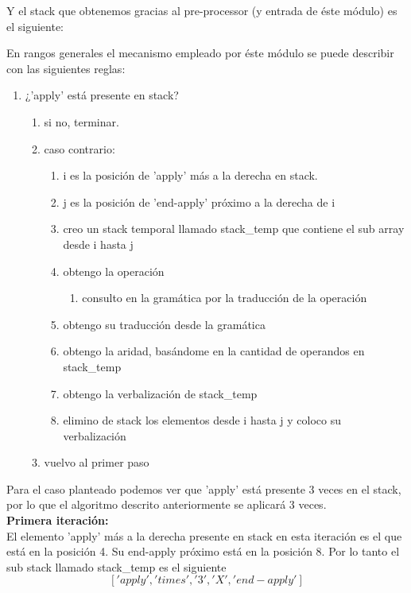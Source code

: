 Y el stack que obtenemos gracias al pre-processor (y entrada de éste módulo) es el siguiente:\\

En rangos generales el mecanismo empleado por éste módulo se puede describir con las siguientes reglas:

\begin{enumerate}
\item ¿'apply' está presente en stack?
\begin{enumerate}
  \item si no, terminar.
  \item caso contrario:
  \begin{enumerate}
     \item i es la posición de 'apply' más a la derecha en stack.
     \item j es la posición de 'end-apply' próximo a la derecha de i
     \item creo un stack temporal llamado stack\_temp que contiene el sub array desde i hasta j
     \item obtengo la operación
     \begin{enumerate}
        \item consulto en la gramática por la traducción de la operación
     \end{enumerate}
     \item obtengo su traducción desde la gramática
     \item obtengo la aridad, basándome en la cantidad de operandos en stack\_temp
     \item obtengo la verbalización de stack\_temp
     \item elimino de stack los elementos desde i hasta j y coloco su verbalización
  \end{enumerate}
  \item vuelvo al primer paso
\end{enumerate}
\end{enumerate}

Para el caso planteado podemos ver que 'apply' está presente 3 veces en el stack, por lo que el algoritmo descrito anteriormente se aplicará 3 veces.\\

{\Large \textbf{Primera iteración:}}\\
El elemento 'apply' más a la derecha presente en stack en esta iteración es el que está en la posición 4. Su end-apply próximo está en la posición 8. Por lo tanto el sub stack llamado stack\_temp es el siguiente
$$['apply', 'times', '3', 'X', 'end-apply']$$

